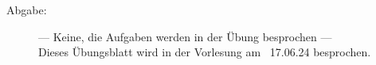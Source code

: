 \documentclass[a4paper,11pt]{scrartcl}
\begin{document}

\begin{description}
\item[Abgabe:] --- Keine, die Aufgaben werden in der Übung besprochen ---\\
Dieses Übungsblatt wird in der Vorlesung am ~17.06.24 besprochen.



\end{description}
\end{document}

